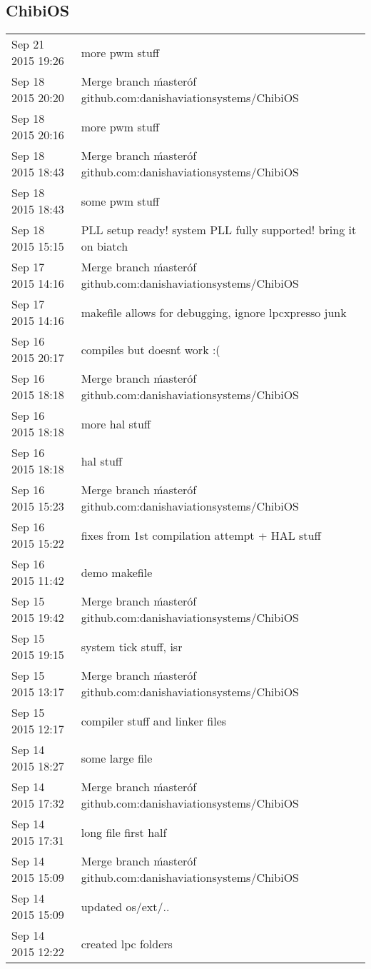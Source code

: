 \subsection{ChibiOS}

\begin{tabular}{ l || p{9cm} }
	\hline			
	Sep 21 2015 19:26	& more pwm stuff	\\
	Sep 18 2015 20:20	& Merge branch \'master\' of github.com:danishaviationsystems/ChibiOS	\\
	Sep 18 2015 20:16	& more pwm stuff	\\
	Sep 18 2015 18:43	& Merge branch \'master\' of github.com:danishaviationsystems/ChibiOS	\\
	Sep 18 2015 18:43	& some pwm stuff	\\
	Sep 18 2015 15:15	& PLL setup ready! system PLL fully supported! bring it on biatch	\\
	Sep 17 2015 14:16	& Merge branch \'master\' of github.com:danishaviationsystems/ChibiOS	\\
	Sep 17 2015 14:16	& makefile allows for debugging, ignore lpcxpresso junk	\\
	Sep 16 2015 20:17	& compiles but doesn\'t work :(	\\
	Sep 16 2015 18:18	& Merge branch \'master\' of github.com:danishaviationsystems/ChibiOS	\\
	Sep 16 2015 18:18	& more hal stuff	\\
	Sep 16 2015 18:18	& hal stuff	\\
	Sep 16 2015 15:23	& Merge branch \'master\' of github.com:danishaviationsystems/ChibiOS	\\
	Sep 16 2015 15:22	& fixes from 1st compilation attempt + HAL stuff	\\
	Sep 16 2015 11:42	& demo makefile	\\
	Sep 15 2015 19:42	& Merge branch \'master\' of github.com:danishaviationsystems/ChibiOS	\\
	Sep 15 2015 19:15	& system tick stuff, isr	\\
	Sep 15 2015 13:17	& Merge branch \'master\' of github.com:danishaviationsystems/ChibiOS	\\
	Sep 15 2015 12:17	& compiler stuff and linker files	\\
	Sep 14 2015 18:27	& some large file	\\
	Sep 14 2015 17:32	& Merge branch \'master\' of github.com:danishaviationsystems/ChibiOS	\\
	Sep 14 2015 17:31	& long file first half	\\
	Sep 14 2015 15:09	& Merge branch \'master\' of github.com:danishaviationsystems/ChibiOS	\\
	Sep 14 2015 15:09	& updated os/ext/..	\\
	Sep 14 2015 12:22	& created lpc folders	\\
	\hline  
\end{tabular}
